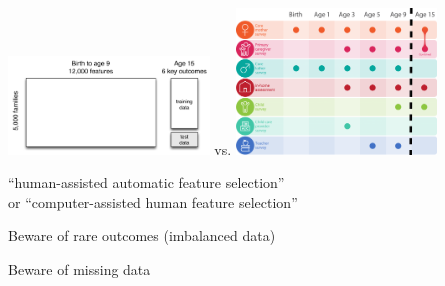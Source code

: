 \documentclass{beamer}
\begin{document}
\begin{frame}

\begin{center}
\includegraphics[width=0.4\textwidth]{figures/challenge_design_matrix} vs. \includegraphics[width=0.4\textwidth]{figures/ff_design_public2}
\end{center}

\end{frame}
\begin{frame}

\begin{center}
\Large{``human-assisted automatic feature selection''}\\
or
\Large{``computer-assisted human feature selection''}\\
\end{center}

\end{frame}
\begin{frame}

\begin{center}
\Large{Beware of rare outcomes (imbalanced data)}
\end{center}

\end{frame}
\begin{frame}

\begin{center}
\Large{Beware of missing data}
\end{center}

\end{frame}
\end{document}
